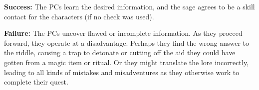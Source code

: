 \textbf{Success:} The PCs learn the desired information, and the sage agrees to be a skill contact for the characters (if no  check was used).

\textbf{Failure:} The PCs uncover flawed or incomplete information. As they proceed forward, they operate at a disadvantage. Perhaps they find the wrong answer to the riddle, causing a trap to detonate or cutting off the aid they could have gotten from a magic item or ritual. Or they might translate the lore incorrectly, leading to all kinds of mistakes and misadventures as they otherwise work to complete their quest.
